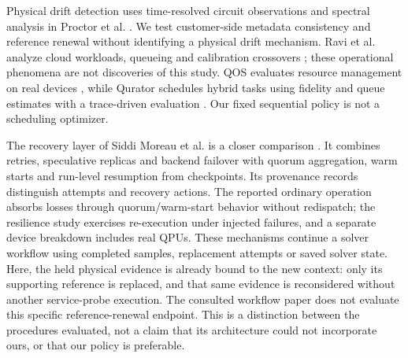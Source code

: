 \documentclass[pdflatex,sn-mathphys-num]{sn-jnl}
\begin{document}
Physical drift detection uses time-resolved circuit observations and spectral analysis in Proctor et al. \cite{proctor}. We test customer-side metadata consistency and reference renewal without identifying a physical drift mechanism. Ravi et al. analyze cloud workloads, queueing and calibration crossovers \cite{ravi}; these operational phenomena are not discoveries of this study. QOS evaluates resource management on real devices \cite{qos}, while Qurator schedules hybrid tasks using fidelity and queue estimates with a trace-driven evaluation \cite{pehlivanoglu2026qurator}. Our fixed sequential policy is not a scheduling optimizer.

The recovery layer of Siddi Moreau et al. is a closer comparison \cite{workflow}. It combines retries, speculative replicas and backend failover with quorum aggregation, warm starts and run-level resumption from checkpoints. Its provenance records distinguish attempts and recovery actions. The reported ordinary operation absorbs losses through quorum/warm-start behavior without redispatch; the resilience study exercises re-execution under injected failures, and a separate device breakdown includes real QPUs. These mechanisms continue a solver workflow using completed samples, replacement attempts or saved solver state. Here, the held physical evidence is already bound to the new context: only its supporting reference is replaced, and that same evidence is reconsidered without another service-probe execution. The consulted workflow paper does not evaluate this specific reference-renewal endpoint. This is a distinction between the procedures evaluated, not a claim that its architecture could not incorporate ours, or that our policy is preferable.
\end{document}

